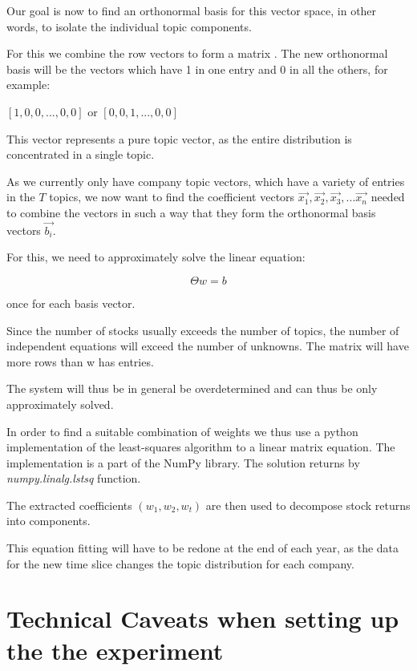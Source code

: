 \documentclass[12pt,journal,letterpaper,oneside,onecolumn]{IEEEtran}
\begin{document}
Our goal is now to find an orthonormal basis for this vector space, in other words, to isolate the individual topic components.

For this we combine the  row vectors to form a matrix .
The new orthonormal basis will be the vectors which have 1  in one entry and 0 in all the others, for example:

$[1,0,0, ... , 0,0]$ or $[0,0,1,..., 0,0]$

This vector represents a pure topic vector, as the entire distribution is concentrated in a single topic.

As we currently only have company topic vectors, which have a variety of entries in the $T$ topics, we now want to find the coefficient vectors $\vec{x_1}, \vec{x_2}, \vec{x_3}, ... \vec{x_n}$  needed to combine the vectors in such a way that they form the orthonormal basis vectors $\vec{b_i}$.

For this, we need to approximately solve the linear equation:

$$\Theta w = b$$

once for each basis vector.

Since the number of stocks usually exceeds the number of topics, the number of independent equations will exceed the number of unknowns. The matrix  will have more rows than w has entries.

The system will thus be in general be overdetermined and can thus be only approximately solved.

In order to find a suitable combination of weights we thus use a python implementation of the least-squares algorithm to a linear matrix equation. The implementation is a part of the NumPy library. The solution returns by \textit{numpy.linalg.lstsq}\cite{ref_linalg_numpy} function.


The extracted coefficients $(w_1, w_2, w_t)$ are then used to decompose stock returns into components.

This equation fitting will have to be redone at the end of each year, as the data for the new time slice changes the topic distribution for each company. 

\section{Technical Caveats when setting up the the experiment}
\end{document}

